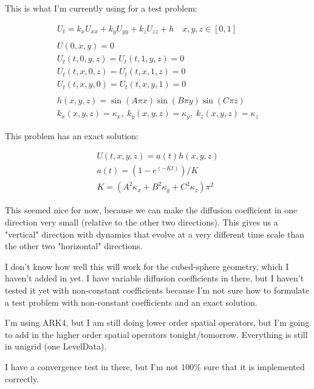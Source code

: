 \documentclass[final,letterpaper,11pt]{report}
\begin{document}
This is what I'm currently using for a test problem:

\begin{align*}
&U_t = k_xU_{xx} + k_yU_{yy} + k_zU_{zz} + h \quad x,y,z \in [0,1] &\\
&\\
&U(0,x,y) = 0 &\\
&U_t(t,0,y,z) = U_t(t,1,y,z) = 0 &\\
&U_t(t,x,0,z) = U_t(t,x,1,z) = 0 &\\
&U_t(t,x,y,0) = U_t(t,x,y,1) = 0 &\\
&&\\
&h(x,y,z) = \sin(A \pi x) \sin(B \pi y) \sin(C \pi z)&\\
&k_x(x,y,z) = \kappa_x, \; k_y(x,y,z) = \kappa_y, \; k_z(x,y,z) = \kappa_z& 
\end{align*}

This problem has an exact solution:

\begin{align*}
&U(t,x,y,z) = a(t) h(x,y,z) &\\
&a(t) = (1 - e^{(-Kt)}) / K &\\
&K = (A^2\kappa_x + B^2\kappa_y + C^2\kappa_z)\pi^2&
\end{align*}

This seemed nice for now, because we can make the diffusion coefficient in one
direction very small (relative to the other two directions). This gives us a
"vertical" direction with dynamics that evolve at a very different time scale
than the other two "horizontal" directions.

I don't know how well this will work for the cubed-sphere geometry, which I
haven't added in yet. I have variable diffusion coefficients in there, but I haven't tested
it yet with non-constant coefficients because I'm not sure how to formulate a test
problem with non-constant coefficients and an exact solution.

I'm using ARK4, but I am still doing lower order spatial operators, but I'm
going to add in the higher order spatial operators tonight/tomorrow. Everything
is still in unigrid (one LevelData).

I have a convergence test in there, but I'm not 100\% sure that it is implemented
correctly.
\end{document}
